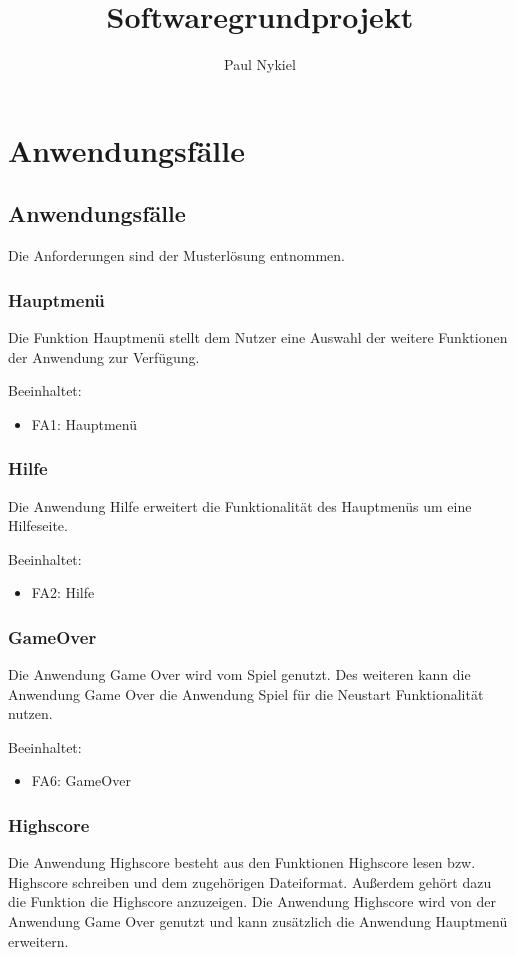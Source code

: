 \documentclass[DIN, pagenumber=false, fontsize=11pt, parskip=half]{scrartcl}
\title{Softwaregrundprojekt}
\author{Paul Nykiel}
\begin{document}
    \maketitle
    \section{Anwendungsfälle}
    \subsection{Anwendungsfälle}
    Die Anforderungen sind der Musterlösung entnommen.
    \subsubsection{Hauptmenü}
    Die Funktion Hauptmenü stellt dem Nutzer eine Auswahl der weitere Funktionen der Anwendung zur Verfügung.

    Beeinhaltet:
    \begin{itemize}
            \item FA1: Hauptmenü
    \end{itemize}
    \subsubsection{Hilfe}
    Die Anwendung Hilfe erweitert die Funktionalität des Hauptmenüs um eine Hilfeseite.
    
    Beeinhaltet:
    \begin{itemize}
            \item FA2: Hilfe
    \end{itemize}
    \subsubsection{GameOver}
    Die Anwendung Game Over wird vom Spiel genutzt. Des weiteren kann die Anwendung Game Over die Anwendung Spiel für die Neustart Funktionalität nutzen.
     
    Beeinhaltet:
    \begin{itemize}
            \item FA6: GameOver 
    \end{itemize}
    \subsubsection{Highscore}
    Die Anwendung Highscore besteht aus den Funktionen Highscore lesen bzw. Highscore schreiben und dem zugehörigen Dateiformat. Außerdem gehört dazu die Funktion
    die Highscore anzuzeigen. Die Anwendung Highscore wird von der Anwendung Game Over genutzt und kann zusätzlich die Anwendung Hauptmenü erweitern.
\end{document}
